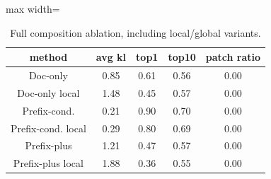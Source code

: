 \begin{table}[t]
\centering
\footnotesize
\begin{adjustbox}{max width=\textwidth}
\begin{tabular}{ccccc}
\toprule
method & avg kl & top1 & top10 & patch ratio \\
\midrule
Doc-only & 0.85 & 0.61 & 0.56 & 0.00 \\
Doc-only local & 1.48 & 0.45 & 0.57 & 0.00 \\
Prefix-cond. & 0.21 & 0.90 & 0.70 & 0.00 \\
Prefix-cond. local & 0.29 & 0.80 & 0.69 & 0.00 \\
Prefix-plus & 1.21 & 0.47 & 0.57 & 0.00 \\
Prefix-plus local & 1.88 & 0.36 & 0.55 & 0.00 \\
\bottomrule
\end{tabular}
\end{adjustbox}
\caption{Full composition ablation, including local/global variants.}
\label{tab:app-composition}
\end{table}
